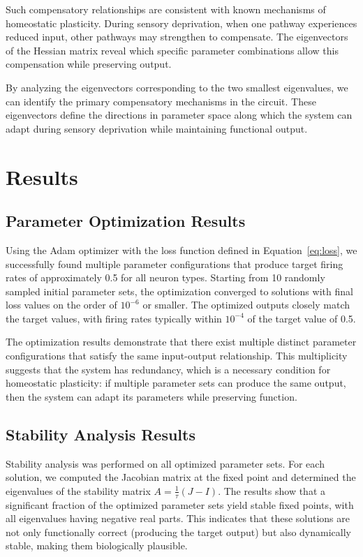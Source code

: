 \documentclass[12pt]{article}
\begin{document}
Such compensatory relationships are consistent with known mechanisms of homeostatic plasticity. During sensory deprivation, when one pathway experiences reduced input, other pathways may strengthen to compensate. The eigenvectors of the Hessian matrix reveal which specific parameter combinations allow this compensation while preserving output.

By analyzing the eigenvectors corresponding to the two smallest eigenvalues, we can identify the primary compensatory mechanisms in the circuit. These eigenvectors define the directions in parameter space along which the system can adapt during sensory deprivation while maintaining functional output.

\section{Results}

\subsection{Parameter Optimization Results}

Using the Adam optimizer with the loss function defined in Equation~\eqref{eq:loss}, we successfully found multiple parameter configurations that produce target firing rates of approximately 0.5 for all neuron types. Starting from 10 randomly sampled initial parameter sets, the optimization converged to solutions with final loss values on the order of $10^{-6}$ or smaller. The optimized outputs closely match the target values, with firing rates typically within $10^{-4}$ of the target value of 0.5.

The optimization results demonstrate that there exist multiple distinct parameter configurations that satisfy the same input-output relationship. This multiplicity suggests that the system has redundancy, which is a necessary condition for homeostatic plasticity: if multiple parameter sets can produce the same output, then the system can adapt its parameters while preserving function.

\subsection{Stability Analysis Results}

Stability analysis was performed on all optimized parameter sets. For each solution, we computed the Jacobian matrix at the fixed point and determined the eigenvalues of the stability matrix $A = \frac{1}{\tau}(J - I)$. The results show that a significant fraction of the optimized parameter sets yield stable fixed points, with all eigenvalues having negative real parts. This indicates that these solutions are not only functionally correct (producing the target output) but also dynamically stable, making them biologically plausible.
\end{document}
